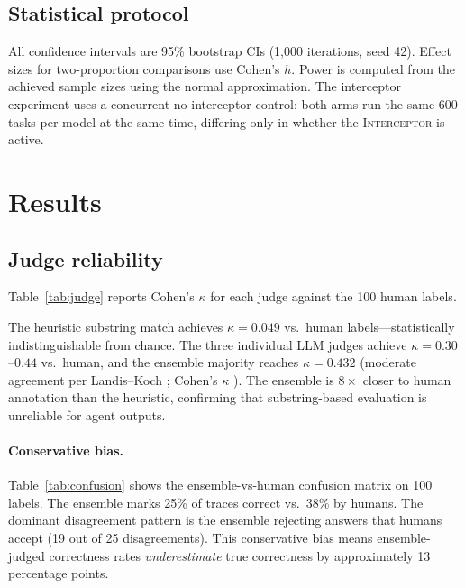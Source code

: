 \documentclass{article}
\newcommand{\interceptor}{\textsc{Interceptor}\xspace}
\begin{document}
\subsection{Statistical protocol}

All confidence intervals are 95\% bootstrap CIs (1{,}000 iterations,
seed 42).
Effect sizes for two-proportion comparisons use Cohen's $h$.
Power is computed from the achieved sample sizes using the normal
approximation.
The interceptor experiment uses a concurrent no-interceptor control:
both arms run the same 600 tasks per model at the same time, differing
only in whether the \interceptor{} is active.


\section{Results}
\label{sec:results}

\subsection{Judge reliability}
\label{sec:judge}

Table~\ref{tab:judge} reports Cohen's $\kappa$ for each judge against
the 100 human labels.

The heuristic substring match achieves $\kappa{=}0.049$ vs.\ human
labels---statistically indistinguishable from chance.
The three individual LLM judges achieve $\kappa{=}0.30$--$0.44$ vs.\
human, and the ensemble majority reaches $\kappa{=}0.432$ (moderate
agreement per Landis--Koch \citep{landis1977kappa};
Cohen's $\kappa$ \citep{cohen1960kappa}).
The ensemble is $8{\times}$ closer to human annotation than the
heuristic, confirming that substring-based evaluation is unreliable
for agent outputs.



\paragraph{Conservative bias.}
Table~\ref{tab:confusion} shows the ensemble-vs-human confusion matrix
on 100 labels.
The ensemble marks 25\% of traces correct vs.\ 38\% by humans.
The dominant disagreement pattern is the ensemble rejecting answers that
humans accept (19 out of 25 disagreements).
This conservative bias means ensemble-judged correctness rates
\emph{underestimate} true correctness by approximately 13 percentage
points.
\end{document}
